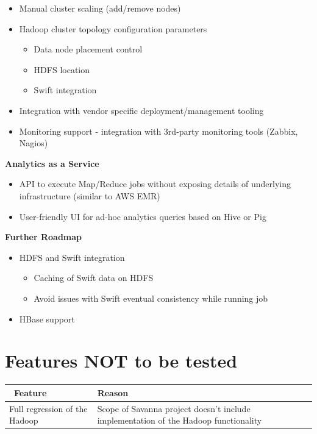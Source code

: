 \documentclass[a4paper,11pt]{article}
\begin{document}
\begin{itemize}
    \item Manual cluster scaling (add/remove nodes)
    \item Hadoop cluster topology configuration parameters
	\begin{itemize}
    		\item Data node placement control
        \item HDFS location
        \item Swift integration
    \end{itemize}

    \item Integration with vendor specific deployment/management tooling
    \item Monitoring support - integration with 3rd-party monitoring tools (Zabbix, Nagios)
\end{itemize}
\textbf{Analytics as a Service}

\begin{itemize}
    \item API to execute Map/Reduce jobs without exposing details of underlying infrastructure (similar to AWS EMR)
    \item User-friendly UI for ad-hoc analytics queries based on Hive or Pig
\end{itemize}
\textbf{Further Roadmap}
\begin{itemize}
    \item HDFS and Swift integration
	\begin{itemize}
    		\item Caching of Swift data on HDFS
        \item Avoid issues with Swift eventual consistency while running job
	\end{itemize}
    \item HBase support
\end{itemize}





\section{Features NOT to be tested}

\begin{tabular}{|p{5cm}|p{10cm}|}
\hline
\ \bf Feature & \bf Reason \\ \hline
Full regression of the Hadoop & Scope of Savanna project doesn't include implementation of the Hadoop functionality \\ \hline
\end{tabular}
\end{document}
